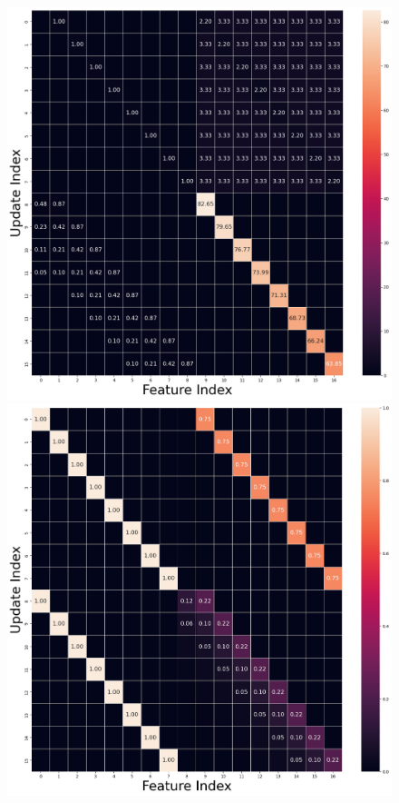 \documentclass[
  letterpaper,
  11pt,
  english,
  singlespacing,
  headsepline]{MastersDoctoralThesis}
\begin{document}
\begin{figure}

\begin{minipage}{0.50\linewidth}
\includegraphics{icmr_figures/icmr_mfc.png}\end{minipage}%
%
\begin{minipage}{0.50\linewidth}
\includegraphics{icmr_figures/icmr_mcf.png}\end{minipage}%

\end{figure}
\end{document}
